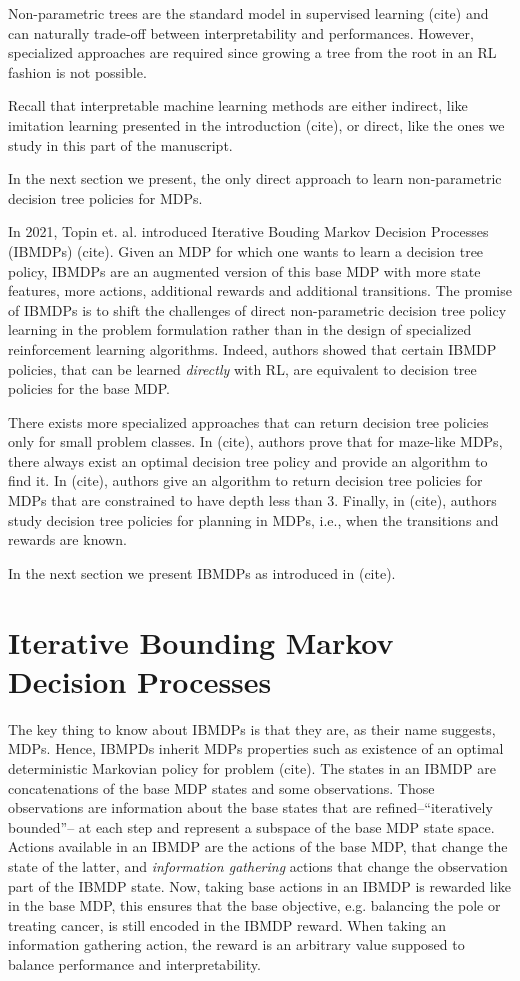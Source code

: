 Non-parametric trees are the standard model in supervised learning (cite) and can naturally trade-off between interpretability and performances. However, specialized approaches are required since growing a tree from the root in an RL fashion is not possible.

Recall that interpretable machine learning methods are either indirect, like imitation learning presented in the introduction (cite), or direct, like the ones we study in this part of the manuscript.

In the next section we present, the only direct approach to learn non-parametric decision tree policies for MDPs.

In 2021, Topin et. al. introduced Iterative Bouding Markov Decision Processes (IBMDPs) (cite). 
Given an MDP for which one wants to learn a decision tree policy, IBMDPs are an augmented version of this base MDP with more state features, more actions, additional rewards and additional transitions.
The promise of IBMDPs is to shift the challenges of direct non-parametric decision tree policy learning in the problem formulation rather than in the design of specialized reinforcement learning algorithms.
Indeed, authors showed that certain IBMDP policies, that can be learned \textit{directly} with RL, are equivalent to decision tree policies for the base MDP. 

There exists more specialized approaches that can return decision tree policies only for small problem classes.
In (cite), authors prove that for maze-like MDPs, there always exist an optimal decision tree policy and provide an algorithm to find it. 
In (cite), authors give an algorithm to return decision tree policies for MDPs that are constrained to have depth less than 3. 
Finally, in (cite), authors study decision tree policies for planning in MDPs, i.e., when the transitions and rewards are known.

In the next section we present IBMDPs as introduced in (cite).
\section{Iterative Bounding Markov Decision Processes}
The key thing to know about IBMDPs is that they are, as their name suggests, MDPs.
Hence, IBMPDs inherit MDPs properties such as existence of an optimal deterministic Markovian policy for problem (cite).
The states in an IBMDP are concatenations of the base MDP states and some observations. Those observations are information about the base states that are refined--``iteratively bounded''-- at each step and represent a subspace of the base MDP state space.
Actions available in an IBMDP are the actions of the base MDP, that change the state of the latter, and \textit{information gathering} actions that change the observation part of the IBMDP state.
Now, taking base actions in an IBMDP is rewarded like in the base MDP, this ensures that the base objective, e.g. balancing the pole or treating cancer, is still encoded in the IBMDP reward. When taking an information gathering action, the reward is an arbitrary value supposed to balance performance and interpretability.
 
